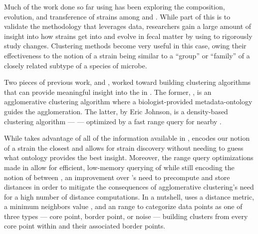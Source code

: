 Much of the work done so far using \cplop{} has been exploring the composition, evolution, and transference of strains among \hosts{} and \spec{}.
While part of this is to validate the \mst{} methodology that leverages \cplop{} data, researchers gain a large amount of insight into how \ecoli{} strains get into and evolve in fecal matter by using \pyros{} to rigorously study changes.
Clustering methods become very useful in this case, owing their effectiveness to the notion of a strain being similar to a ``group'' or ``family'' of a closely related subtype of a species of microbe.

Two pieces of previous work, \cite{montana2013algorithms, montana2013ontological} and \cite{johnson2015density}, worked toward building clustering algorithms that can provide meaningful insight into the \ecoli{} \isols{} in \cplop{}.
The former, \ohclust{}, is an agglomerative clustering algorithm where a biologist-provided metadata-ontology guides the agglomeration.
The latter, by Eric Johnson, is a density-based clustering algorithm --- \dbscan{} --- optimized by a fast range query for nearby \isols{}.

While \ohclust{} takes advantage of all of the information available in \cplop{}, \dbscan{} encodes our notion of a strain the closest and allows for strain discovery without needing to guess what ontology provides the best insight.
Moreover, the range query optimizations made in \cite{johnson2015density} allow for efficient, low-memory querying of \isols{} while still encoding the notion of \pearson{} between \isols{}, an improvement over \ohclust{}'s need to precompute and store distances in order to mitigate the consequences of agglomerative clustering's need for a high number of distance computations.
In a nutshell, \dbscan{} uses a distance metric, a minimum neighbors value \minneigh{}, and an \eps{} range to categorize data points as one of three types --- core point, border point, or noise --- building clusters from every core point within \eps{} and their associated border points.


